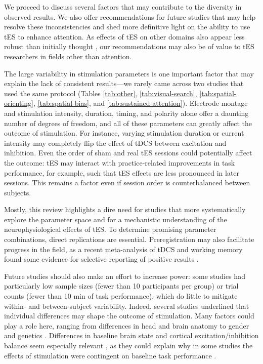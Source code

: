 \documentclass[11pt,]{memoir}
\begin{document}
We proceed to discuss several factors that may contribute to the diversity in observed results. We also offer recommendations for future studies that may help resolve these inconsistencies and shed more definitive light on the ability to use tES to enhance attention. As effects of tES on other domains also appear less robust than initially thought \autocites[e.g.,][]{Horvath2015}{Lopez-Alonso2014}{Lopez-Alonso2015}{Mancuso2016}, our recommendations may also be of value to tES researchers in fields other than attention.

The large variability in stimulation parameters is one important factor that may explain the lack of consistent results---we rarely came across two studies that used the same protocol (Tables \ref{tab:other}, \ref{tab:visual-search}, \ref{tab:spatial-orienting}, \ref{tab:spatial-bias}, and \ref{tab:sustained-attention}). Electrode montage and stimulation intensity, duration, timing, and polarity alone offer a daunting number of degrees of freedom, and all of these parameters can greatly affect the outcome of stimulation. For instance, varying stimulation duration \autocite{Monte-Silva2013} or current intensity \autocite{Batsikadze2013} may completely flip the effect of tDCS between excitation and inhibition. Even the order of sham and real tES sessions could potentially affect the outcome: tES may interact with practice-related improvements in task performance, for example, such that tES effects are less pronounced in later sessions. This remains a factor even if session order is counterbalanced between subjects.

Mostly, this review highlights a dire need for studies that more systematically explore the parameter space and for a mechanistic understanding of the neurophysiological effects of tES. To determine promising parameter combinations, direct replications are essential. Preregistration may also facilitate progress in the field, as a recent meta-analysis of tDCS and working memory found some evidence for selective reporting of positive results \autocite{Mancuso2016}.

Future studies should also make an effort to increase power: some studies had particularly low sample sizes (fewer than 10 participants per group) or trial counts (fewer than 10 min of task performance), which do little to mitigate within- and between-subject variability. Indeed, several studies underlined that individual differences may shape the outcome of stimulation. Many factors could play a role here, ranging from differences in head and brain anatomy to gender and genetics \autocites[for reviews, see][]{Krause2014}{Li2015b}. Differences in baseline brain state and cortical excitation/inhibition balance seem especially relevant \autocite{Krause2013}, as they could explain why in some studies the effects of stimulation were contingent on baseline task performance \autocites[e.g.,][]{Benwell2015}{Learmonth2015}{London2015}.
\end{document}
